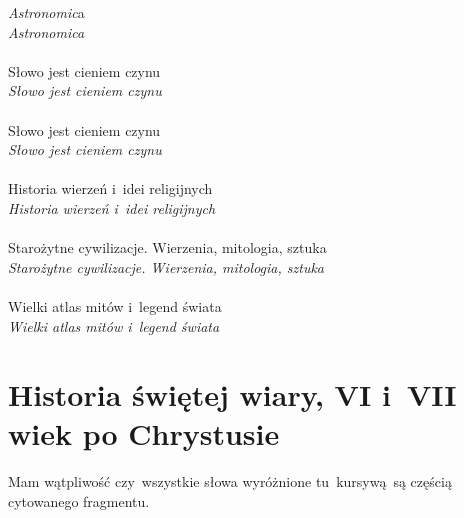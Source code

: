 \documentclass[a4paper,11pt]{article}
\begin{document}
\Jest  \emph{Astronomic}a \\
\Powin \emph{Astronomica} \\
 \\
\Jest  Słowo jest cieniem czynu \\
\Powin \emph{Słowo jest cieniem czynu} \\
 \\
\Jest  Słowo jest cieniem czynu \\
\Powin \emph{Słowo jest cieniem czynu} \\
 \\
\Jest  Historia wierzeń i~idei religijnych \\
\Powin \emph{Historia wierzeń i~idei religijnych} \\
 \\
\Jest  Starożytne cywilizacje. Wierzenia, mitologia, sztuka \\
\Powin \emph{Starożytne cywilizacje. Wierzenia, mitologia, sztuka} \\
 \\
\Jest  Wielki atlas mitów i~legend świata \\
\Powin \emph{Wielki atlas mitów i~legend świata} \\


\vspace{\spaceTwo}










\section{Historia świętej wiary, VI i~VII wiek po Chrystusie}

\vspace{\spaceTwo}






\start {} Mam wątpliwość czy~wszystkie słowa wyróżnione
tu~kursywą~są częścią cytowanego fragmentu.

\end{document}
